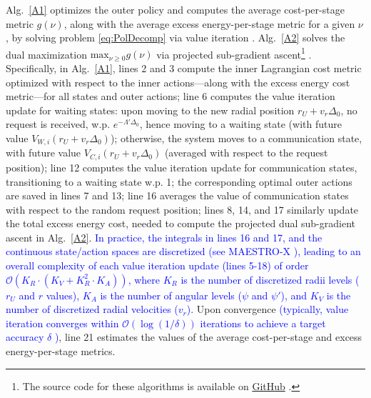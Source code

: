 \documentclass[12pt, draftcls, onecolumn]{IEEEtran}
\theoremstyle{plain}
\theoremstyle{definition}
\theoremstyle{remark}
\newcommand\hlt[1]{\textcolor{blue}{#1}}
\begin{document}
Alg.~\ref{A1} optimizes the outer policy and computes the average cost-per-stage metric $g(\nu)$, along with the average excess energy-per-stage metric for a given $\nu$, by solving problem \eqref{eq:PolDecomp} via value iteration \cite{Bertsekas}. Alg.~\ref{A2} solves the dual maximization $\mathrm{max}_{\nu{\geq}0}g(\nu)$ via projected sub-gradient ascent\footnote{The source code for these algorithms is available on \href{https://github.com/bharathkeshavamurthy/MAESTRO-X.git}{GitHub} \cite{MAESTRO-X}.} \cite{SubgradientMethods}. Specifically, in Alg.~\ref{A1}, lines 2 and 3 compute the inner Lagrangian cost metric optimized with respect to the inner actions---along with the excess energy cost metric---for all states and outer actions; line 6 computes the value iteration update for waiting states:
upon moving to the new radial position $r_{U}{+}v_{r}\Delta_{0}$, 
no request is received, w.p. $e^{-\Lambda'\Delta_{0}}$, hence moving to a waiting state (with future value $V_{W,i}(r_{U}{+}v_{r}\Delta_{0})$); otherwise, the system moves to a communication state, with future value $V_{C,i}(r_{U}{+}v_{r}\Delta_{0})$ (averaged with respect to the request position); line 12 computes the value iteration update for communication states, transitioning to a waiting state w.p. 1; the corresponding optimal outer actions are saved in lines 7 and 13; line 16 averages the value of communication states with respect to the random request position; lines 8, 14, and 17 similarly update the total excess energy cost, needed to compute the projected dual sub-gradient ascent in Alg.~\ref{A2}.
\label{discretizeVI}\hlt{In practice, the integrals in lines 16 and 17, and the continuous state/action spaces are discretized (see MAESTRO-X \cite{MAESTRO-X}), leading to an overall complexity of each value iteration update (lines 5-18) of order $\mathcal O(K_R\cdot(K_V+K_R^2\cdot K_A))$, where $K_R$ is the number of discretized radii levels ($r_U$ and $r$ values), $K_A$ is the number of angular levels ($\psi$ and $\psi'$), and $K_V$ is the number of discretized radial velocities ($v_r$).} Upon convergence \hlt{(typically, value iteration converges within $\mathcal O(\log(1/\delta))$ iterations to achieve a target accuracy $\delta$ \cite[Sec. V]{Bertsekas})}, line 21 estimates the values of the average cost-per-stage and excess energy-per-stage metrics.
\end{document}
